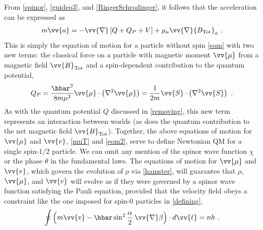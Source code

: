 \documentclass[12pt,secnumarabic,balancelastpage,amsmath,amssymb,nofootinbib]{article}
\begin{document}
From \eqref{spinor}, \eqref{guideq3}, and \eqref{RingerSchrodinger}, it follows that the acceleration can be expressed as
\begin{align}
m \vv{a}=-\vv{\nabla}\left[Q+Q_{P}+V\right]+\mu_a \vv{\nabla} {B_{\text{Tot}}}_a\ .
\label{eom2}
\end{align}
This is simply the equation of motion for a particle without spin \eqref{eom} with two new terms: the classical force on a particle with magnetic moment $\vv{\mu}$ from a magnetic field $\vv{B}_{\text{Tot}}$ and a spin-dependent contribution to the quantum potential,
\begin{equation}
Q_P=\frac{\hbar^2}{8 m \mu^2}\vv{\mu}\cdot\left(\nabla^2 \vv{\mu}\right)=\frac{1}{2 m}\vv{S}\cdot\left(\nabla^2 \vv{S}\right)\ .
\end{equation}
As with the quantum potential $Q$ discussed in \textsection \ref{removing}, this new term represents an interaction between worlds (as does the quantum contribution to the net magnetic field $\vv{B}_{\text{Tot}}$).  Together, the above equations of motion for $\vv{\mu}$ and $\vv{v}$,  \eqref{muT} and \eqref{eom2}, serve to define Newtonian QM for a single spin-$1/2$ particle.  We can omit any mention of the spinor wave function $\chi$ or the phase $\theta$ in the fundamental laws.  The equations of motion for $\vv{\mu}$ and $\vv{v}$, which govern the evolution of $\rho$ via \eqref{hamster}, will guarantee that $\rho$, $\vv{\mu}$, and $\vv{v}$ will evolve as if they were governed by a spinor wave function satisfying the Pauli equation, provided that the velocity field obeys a constraint like the one imposed for spin-$0$ particles in \textsection \ref{defining},
\begin{equation}
\oint{\left(m\vv{v}-\hbar \sin^2\frac{\alpha}{2} \: \vv{\nabla}\beta \right)\cdot d\vv{\ell}}=nh\ .
\label{}
\end{equation}
\end{document}
